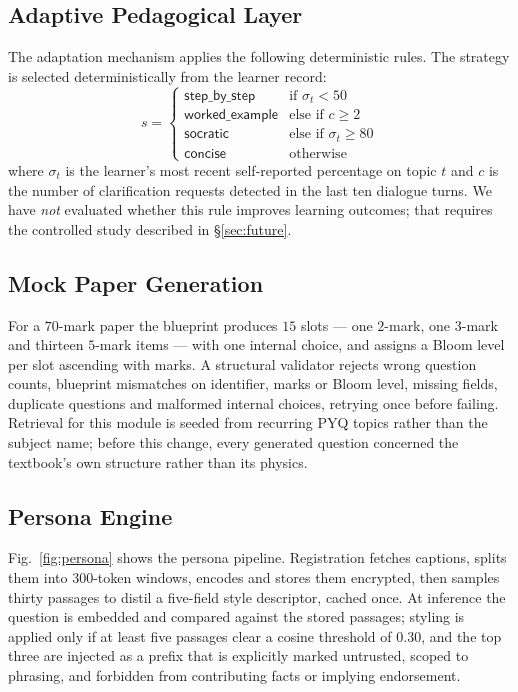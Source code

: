 \documentclass[conference]{IEEEtran}
\begin{document}
\subsection{Adaptive Pedagogical Layer}
\label{sec:adaptive}
The adaptation mechanism applies the following deterministic rules.
The strategy is selected deterministically from the learner record:
\begin{equation}
s =
\begin{cases}
\textsf{step\_by\_step} & \text{if } \sigma_t < 50\\
\textsf{worked\_example} & \text{else if } c \geq 2\\
\textsf{socratic} & \text{else if } \sigma_t \geq 80\\
\textsf{concise} & \text{otherwise}
\end{cases}
\end{equation}
where $\sigma_t$ is the learner's most recent self-reported percentage on topic
$t$ and $c$ is the number of clarification requests detected in the last ten
dialogue turns. We have \emph{not} evaluated whether this rule improves learning
outcomes; that requires the controlled study described in §\ref{sec:future}.

\subsection{Mock Paper Generation}
For a $70$-mark paper the blueprint produces $15$ slots --- one $2$-mark, one
$3$-mark and thirteen $5$-mark items --- with one internal choice, and assigns a
Bloom level per slot ascending with marks. A structural validator rejects wrong
question counts, blueprint mismatches on identifier, marks or Bloom level,
missing fields, duplicate questions and malformed internal choices, retrying once
before failing. Retrieval for this module is seeded from recurring PYQ topics
rather than the subject name; before this change, every generated question
concerned the textbook's own structure rather than its physics.

\subsection{Persona Engine}
\label{sec:persona}
Fig.~\ref{fig:persona} shows the persona pipeline.
Registration fetches captions, splits them into $300$-token windows,
encodes and stores them encrypted, then samples thirty passages to distil a
five-field style descriptor, cached once. At inference the question is embedded
and compared against the stored passages; styling is applied only if at least
five passages clear a cosine threshold of $0.30$, and the top three are injected
as a prefix that is explicitly marked untrusted, scoped to phrasing, and
forbidden from contributing facts or implying endorsement.
\end{document}
